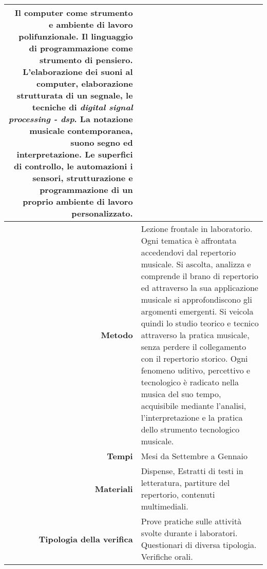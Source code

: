 \begin{longtable}{r|L{0.71\textwidth}}
    Il computer come strumento e ambiente di lavoro polifunzionale.
    Il linguaggio di programmazione come strumento di pensiero. \newline
    L'elaborazione dei suoni al computer, elaborazione strutturata di un segnale,
    le tecniche di \emph{digital signal processing - dsp}.\newline
    La notazione musicale contemporanea, suono segno ed interpretazione.\newline
    Le superfici di controllo, le automazioni i sensori, strutturazione e
    programmazione di un proprio ambiente di lavoro personalizzato. \\
  \hline
  \textbf{Metodo} &
    Lezione frontale in laboratorio. \newline
    Ogni tematica è affrontata accedendovi dal repertorio musicale.
    Si ascolta, analizza e comprende il brano di repertorio ed attraverso
    la sua applicazione musicale si approfondiscono gli argomenti emergenti.
    Si veicola quindi lo studio teorico e tecnico attraverso la pratica
    musicale, senza perdere il collegamento con il repertorio storico.
    Ogni fenomeno uditivo, percettivo e tecnologico è radicato nella
    musica del suo tempo, acquisibile mediante l'analisi, l'interpretazione
    e la pratica dello strumento tecnologico musicale. \\
  \hline
  \textbf{Tempi} &
    Mesi da Settembre a Gennaio\\
  \hline
  \textbf{Materiali} &
    Dispense, Estratti di testi in letteratura, partiture del repertorio,
    contenuti multimediali. \\
  \hline
  \textbf{Tipologia della verifica} &
    Prove pratiche sulle attività svolte durante i laboratori. \newline
    Questionari di diversa tipologia. \newline
    Verifiche orali.
\end{longtable}%

\clearpage

